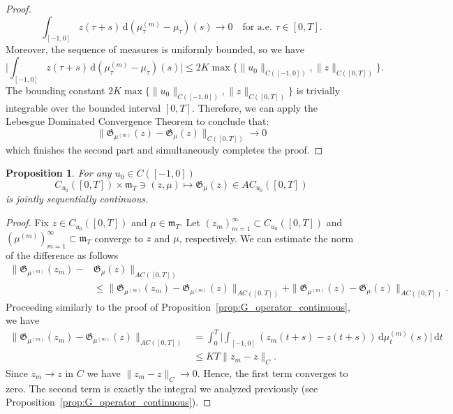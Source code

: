 \documentclass[reqno]{amsart}
\theoremstyle{plain}
\newtheorem{proposition}{Proposition}[section]
\numberwithin{equation}{section}
\numberwithin{definition}{section}
\newcommand{\dd}{\ensuremath{\mathrm{d}}}
\begin{document}
\begin{proof}
\begin{equation*}
    \int_{[-1,0]} z(\tau+s)\, \dd(\mu^{(m)}_{\tau} - \mu_\tau)(s)  \to 0 \quad \text{for a.e. } \tau \in [0,T].
\end{equation*}
Moreover, the sequence of measures is uniformly bounded, so we have 
\begin{equation*}
    \Big|\int_{[-1,0]} z(\tau+s)\, \dd(\mu^{(m)}_{\tau} - \mu_\tau)(s)  \Big|  \le 2K\max\{\|u_0\|_{C([-1,0])},\|z\|_{C([0,T])}\}.
\end{equation*}
The bounding constant $2K\max\{\|u_0\|_{C([-1,0])},\|z\|_{C([0,T])}\}$ is trivially integrable over the bounded interval $[0,T]$. Therefore, we can apply the Lebesgue Dominated Convergence Theorem to conclude that:
\begin{equation*}
     \|\mathfrak{G}_{\mu^{(m)}}(z) - \mathfrak{G}_\mu(z)\|_{C([0,T])} \to 0
\end{equation*}
which finishes the second part and simultaneously completes the proof.
\end{proof}

\begin{proposition}
    \label{prop:G_operator_continuous-AC}
   For any $u_0\in C([-1, 0])$
       \begin{equation*}
          C_{u_0}([0,T]) \times \mathfrak{m}_T \ni (z, \mu)  \mapsto \mathfrak{G}_{\mu}(z) \in AC_{u_0}([0,T]) 
    \end{equation*}
    is jointly sequentially continuous. 
\end{proposition}
\begin{proof}
 Fix $z\in C_{u_0}([0,T])$ and $\mu \in  \mathfrak{m}_T$. Let  $(z_m)_{m=1}^{\infty}\subset C_{u_0}([0,T])$ and $(\mu^{(m)})_{m=1}^{\infty}\subset \mathfrak{m}_T$ converge to $z$ and $\mu$, respectively. We can estimate the norm of the difference as follows
  \begin{equation*}
\begin{split}
        \|\mathfrak{G}_{\mu^{(m)}}(z_m) - & \mathfrak{G}_\mu(z)\|_{AC([0,T])}   \\ 
        & \le \|\mathfrak{G}_{\mu^{(m)}}(z_m) - \mathfrak{G}_{\mu^{(m)}}(z)\|_{AC([0,T])} + \|\mathfrak{G}_{\mu^{(m)}}(z) - \mathfrak{G}_\mu(z)\|_{AC([0,T])}.
\end{split}
\end{equation*}
Proceeding similarly to the proof of Proposition~\ref{prop:G_operator_continuous}, we have
\begin{equation*}
\begin{split}
        \|\mathfrak{G}_{\mu^{(m)}}(z_m) - \mathfrak{G}_{\mu^{(m)}}(z)\|_{AC([0,T])} & = \int_0^T \Big| \int_{[-1,0]} (z_m(t+s) - z(t+s)) \,\dd\mu^{(m)}_{t}(s) \Big| \, \dd t \\ 
        & \le  KT  \|z_m - z\|_C.
\end{split}
\end{equation*}
Since $z_m \to z$ in $C$ we have $\|z_m - z\|_C \to 0$. Hence, the first term converges to zero. The second term is exactly the integral we analyzed previously (see Proposition~\ref{prop:G_operator_continuous}). 
\end{proof}
\end{document}
